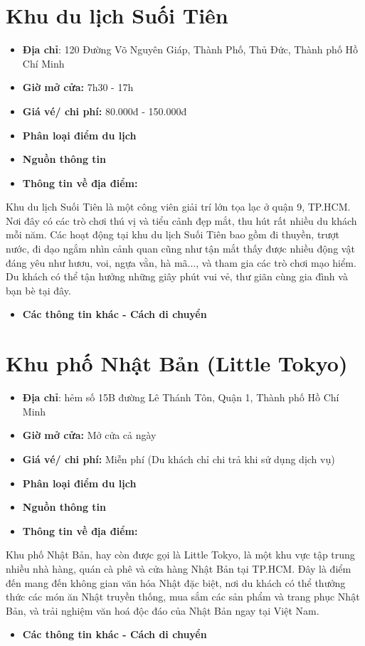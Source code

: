 \documentclass{article}
\begin{document}
\section{Khu du lịch Suối Tiên}
\begin{itemize}
    \item{\textbf{Địa chỉ}: 120 Đường Võ Nguyên Giáp, Thành Phố, Thủ Đức, Thành phố Hồ Chí Minh}
    \item{\textbf{Giờ mở cửa:} 7h30 - 17h}
    \item{\textbf{Giá vé/ chi phí:} 80.000đ - 150.000đ}
    \item{\textbf{Phân loại điểm du lịch} }
    \item{\textbf{Nguồn thông tin}}
    \item{\textbf{Thông tin về địa điểm:}}
\end{itemize}
Khu du lịch Suối Tiên là một công viên giải trí lớn tọa lạc ở quận 9, TP.HCM. Nơi đây có các trò chơi thú vị và tiểu cảnh đẹp mắt, thu hút rất nhiều du khách mỗi năm. Các hoạt động tại khu du lịch Suối Tiên bao gồm đi thuyền, trượt nước, đi dạo ngắm nhìn cảnh quan cũng như tận mắt thấy được nhiều động vật đáng yêu như hươu, voi, ngựa vằn, hà mã..., và tham gia các trò chơi mạo hiểm. Du khách có thể tận hưởng những giây phút vui vẻ, thư giãn cùng gia đình và bạn bè tại đây.
\begin{itemize}
    \item{\textbf{Các thông tin khác - Cách di chuyển}}
\end{itemize}

\section{Khu phố Nhật Bản (Little Tokyo)}
\begin{itemize}
    \item{\textbf{Địa chỉ}: hẻm số 15B đường Lê Thánh Tôn, Quận 1, Thành phố Hồ Chí Minh}
    \item{\textbf{Giờ mở cửa:} Mở cửa cả ngày}
    \item{\textbf{Giá vé/ chi phí:} Miễn phí (Du khách chỉ chi trả khi sử dụng dịch vụ)}
    \item{\textbf{Phân loại điểm du lịch} }
    \item{\textbf{Nguồn thông tin}}
    \item{\textbf{Thông tin về địa điểm:}}
\end{itemize}
Khu phố Nhật Bản, hay còn được gọi là Little Tokyo, là một khu vực tập trung nhiều nhà hàng, quán cà phê và cửa hàng Nhật Bản tại TP.HCM. Đây là điểm đến mang đến không gian văn hóa Nhật đặc biệt, nơi du khách có thể thưởng thức các món ăn Nhật truyền thống, mua sắm các sản phẩm và trang phục Nhật Bản, và trải nghiệm văn hoá độc đáo của Nhật Bản ngay tại Việt Nam.
\begin{itemize}
    \item{\textbf{Các thông tin khác - Cách di chuyển}}
\end{itemize}
\end{document}
